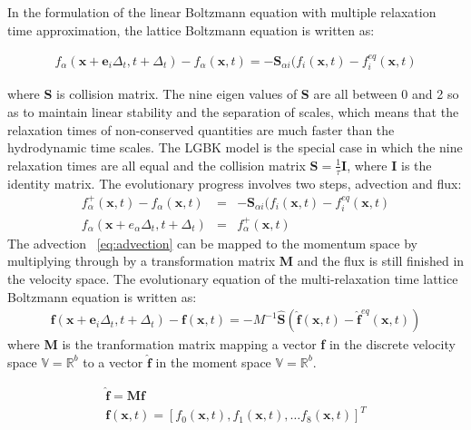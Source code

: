 In the formulation of the linear Boltzmann equation with multiple relaxation time approximation, the lattice Boltzmann equation is written as:

\begin{eqnarray}
f_{\alpha}(\mathbf{x}+\mathbf{e}_i\Delta_t, t+ \Delta_t)-f_{\alpha}(\mathbf{x},t)=-\mathbf{S}_{\alpha i}(f_i(\mathbf{x},t)-f_i^{eq}(\mathbf{x},t)
\end{eqnarray}

\noindent where \textbf{S} is collision matrix. The nine eigen values of \textbf{S} are all between 0 and 2 so as to maintain linear stability and the separation of scales, which means that the relaxation times of non-conserved quantities are much faster than the hydrodynamic time scales. The LGBK model is the special case in which the nine relaxation times are all equal and the collision matrix $\mathbf{S}=\frac{1}{\tau}\mathbf{I}$, where \textbf{I} is the identity matrix. The evolutionary progress involves two steps, advection and flux:
\begin{eqnarray}
f_{\alpha}^+(\mathbf{x},t)-f_{\alpha}(\mathbf{x},t) & = & -\mathbf{S}_{\alpha i}(f_i(\mathbf{x},t)-f_i^{eq}(\mathbf{x},t) \label{eq:advection}\\
f_{\alpha}(\mathbf{x}+e_{\alpha}\Delta_t, t+\Delta_t) & = & f_{\alpha}^+(\mathbf{x},t)
\end{eqnarray}
\noindent The advection ~\cref{eq:advection} can be mapped to the momentum space by multiplying through by a transformation matrix \textbf{M} and the flux is still finished in the velocity space. The evolutionary equation of the multi-relaxation time lattice Boltzmann equation is written as:
\begin{eqnarray}
\mathbf{f}(\mathbf{x}+\mathbf{e}_i\Delta_t, t+ \Delta_t)-\mathbf{f}(\mathbf{x},t)=-M^{-1}\hat{\mathbf{S}}(\hat{\mathbf{f}}(\mathbf{x},t)-\hat{\mathbf{f}}^{eq}(\mathbf{x},t))
\end{eqnarray}
\noindent where \textbf{M} is the tranformation matrix mapping a vector \textbf{f} in the discrete velocity space $\mathds{V}=\mathds{R}^b$ to a vector $\hat{\mathbf{f}}$ in the moment space $\mathds{V}=\mathds{R}^b$. 

\begin{eqnarray}
\nonumber
\hat{\mathbf{f}}= \mathbf{M}\mathbf{f} \\ 
\nonumber
\mathbf{f}(\mathbf{x},t) =\left[f_0(\mathbf{x},t),f_1(\mathbf{x},t),\dots f_8(\mathbf{x},t)\right]^T
\end{eqnarray}

